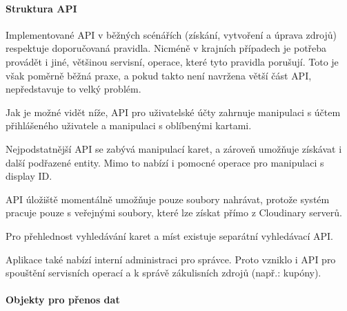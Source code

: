			\paragraph{Struktura API}

			Implementované \ac{API} v běžných scénářích (získání, vytvoření a úprava zdrojů) respektuje doporučovaná pravidla.
			Nicméně v krajních případech je potřeba provádět i jiné, většinou servisní, operace, které tyto pravidla porušují.
			Toto je však poměrně běžná praxe, a pokud takto není navržena větší část \ac{API}, nepředstavuje to velký
			problém.

			Jak je možné vidět níže, \ac{API} pro uživatelské účty zahrnuje manipulaci s účtem přihlášeného uživatele a manipulaci
			s oblíbenými kartami.


			Nejpodstatnější \ac{API} se zabývá manipulací karet, a zároveň umožňuje získávat i další podřazené entity.
			Mimo to nabízí i pomocné operace pro manipulaci s display ID.


			\ac{API} úložiště momentálně umožňuje pouze soubory nahrávat, protože systém pracuje pouze s veřejnými soubory, které
			lze získat přímo z Cloudinary serverů.


			Pro přehlednost vyhledávání karet a míst existuje separátní vyhledávací \ac{API}.


			Aplikace také nabízí interní administraci pro správce.
			Proto vzniklo i \ac{API} pro spouštění servisních operací a k správě zákulisních zdrojů (např.: kupóny).


			\paragraph{Objekty pro přenos dat}

